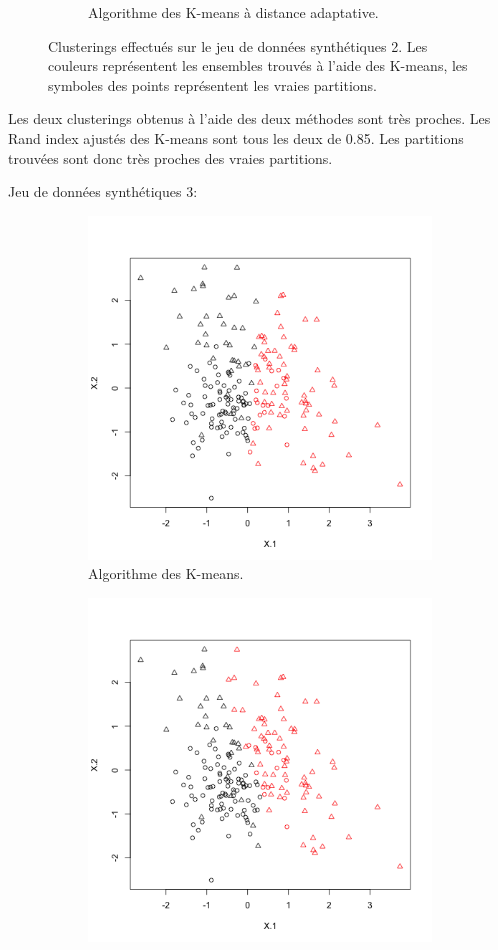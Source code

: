 \documentclass[a4paper,11pt,oneside,roman]{article}
\begin{document}
\begin{figure}
\begin{subfigure}{.5\textwidth}
          \caption{Algorithme des K-means à distance adaptative.}
        \end{subfigure}
        \caption{Clusterings effectués sur le jeu de données synthétiques 2. Les couleurs représentent les ensembles trouvés à l'aide des K-means, les symboles des points représentent les vraies partitions.}
        \label{fig_synth_2}
    \end{figure}
    Les deux clusterings obtenus à l'aide des deux méthodes sont très proches.
    Les Rand index ajustés des K-means sont tous les deux de 0.85. Les partitions trouvées sont donc très proches des vraies partitions.
    
    Jeu de données synthétiques 3:
    \begin{figure}
        \centering
        \begin{subfigure}{.5\textwidth}
          \centering
          \includegraphics[width=.8\linewidth]{imgs/K_means_synth_3.png}
          \caption{Algorithme des K-means.}
        \end{subfigure}%
        \begin{subfigure}{.5\textwidth}
          \centering
          \includegraphics[width=.8\linewidth]{imgs/K_means_adapt_synth_3.png}

\end{subfigure}
\end{figure}
\end{document}

